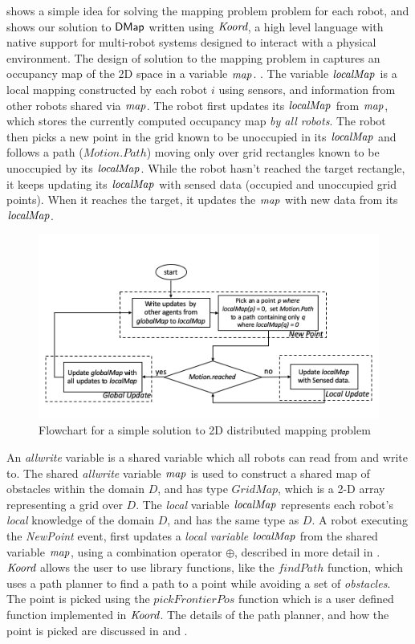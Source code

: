  shows a simple idea for solving the mapping problem problem for each robot, and  shows our solution to ${\sf DMap}$ written using $\emph{Koord}$, a high level language with native support for multi-robot systems designed to interact with a physical environment. The design of solution to the mapping problem in  captures an occupancy map of the 2D space in a variable $\mathit{map}$. . The variable $\mathit{localMap}$ is a local mapping constructed by each robot $i$ using sensors, and information from other robots shared via $\mathit{map}$. The robot first updates its $\mathit{localMap}$ from $\mathit{map}$, which stores the currently computed occupancy map \emph{by all robots}.  The robot then picks a new point in the grid known to be unoccupied in its $\mathit{localMap}$ and follows a path ($\mathit{Motion.Path}$) moving only over grid rectangles known to be unoccupied by its $\mathit{localMap}$. While the robot hasn't reached the target rectangle, it keeps updating its $\mathit{localMap}$ with sensed data (occupied and unoccupied grid points). When it reaches the target, it updates the $\mathit{map}$ with new data from its $\mathit{localMap}$.


\begin{figure}[!htbp]
    \centering
    \includegraphics[width=\linewidth]{figs/map_flowchart.png}
    \caption{Flowchart for a simple solution to 2D distributed mapping problem\vspace{-2mm}}
    \label{fig:flowmap1}
\end{figure}

 An \emph{allwrite} variable is a shared variable which all robots can read from and write to. The shared \emph{allwrite} variable $\mathit{map}$ is used to construct a shared map of obstacles within the domain $D$, and has type $\mathit{GridMap}$, which is a 2-D array representing a grid over $D$. The \emph{local} variable $\mathit{localMap}$ represents each robot's \emph{local} knowledge of the domain $D$, and has the same type as $D$. A robot executing the \emph{NewPoint} event, first updates a \emph{local variable} $\mathit{localMap}$ from the shared variable $\mathit{map}$, using a combination operator $\oplus$, described in more detail in . $\emph{Koord}$ allows the user to use library functions, like the $\mathit{findPath}$ function, which uses a path planner to find a path to a point while avoiding a set of \emph{obstacles}. The point is picked using the $\mathit{pickFrontierPos}$ function which is a user defined function implemented in $\emph{Koord}$. The details of the path planner, and how the point is picked are discussed in and  .

